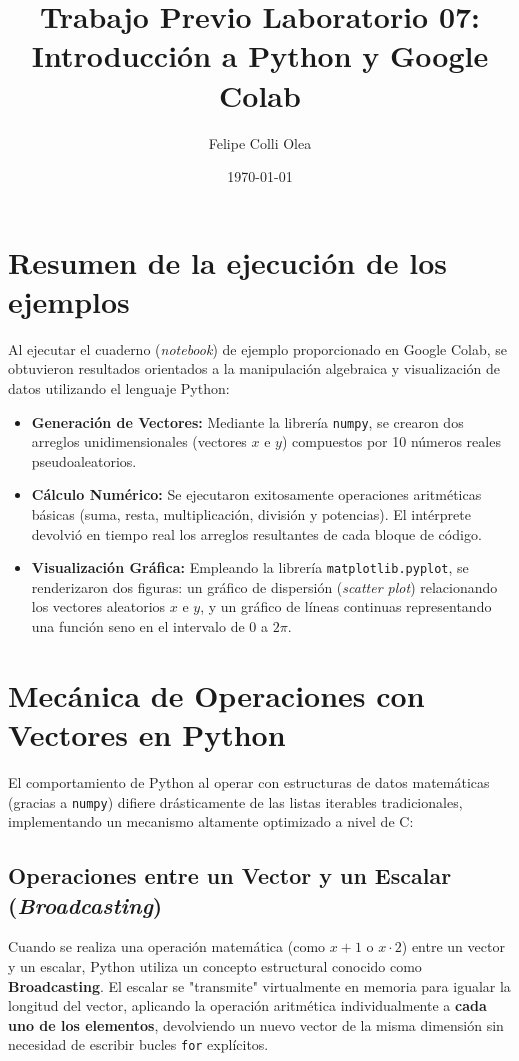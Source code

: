 \documentclass[11pt]{article}
\title{Trabajo Previo Laboratorio 07: \\ \large{Introducción a Python y Google Colab}}
\author{Felipe Colli Olea}
\date{\today}
\begin{document}
\maketitle
\thispagestyle{fancy}

\section{Resumen de la ejecución de los ejemplos}

Al ejecutar el cuaderno (\textit{notebook}) de ejemplo proporcionado en Google Colab, se obtuvieron resultados orientados a la manipulación algebraica y visualización de datos utilizando el lenguaje Python:

\begin{itemize}
	\item \textbf{Generación de Vectores:} Mediante la librería \texttt{numpy}, se crearon dos arreglos unidimensionales (vectores $x$ e $y$) compuestos por 10 números reales pseudoaleatorios.
	\item \textbf{Cálculo Numérico:} Se ejecutaron exitosamente operaciones aritméticas básicas (suma, resta, multiplicación, división y potencias). El intérprete devolvió en tiempo real los arreglos resultantes de cada bloque de código.
	\item \textbf{Visualización Gráfica:} Empleando la librería \texttt{matplotlib.pyplot}, se renderizaron dos figuras: un gráfico de dispersión (\textit{scatter plot}) relacionando los vectores aleatorios $x$ e $y$, y un gráfico de líneas continuas representando una función seno en el intervalo de $0$ a $2\pi$.
\end{itemize}

\section{Mecánica de Operaciones con Vectores en Python}

El comportamiento de Python al operar con estructuras de datos matemáticas (gracias a \texttt{numpy}) difiere drásticamente de las listas iterables tradicionales, implementando un mecanismo altamente optimizado a nivel de C:

\subsection*{Operaciones entre un Vector y un Escalar (\textit{Broadcasting})}
Cuando se realiza una operación matemática (como $x + 1$ o $x \cdot 2$) entre un vector y un escalar, Python utiliza un concepto estructural conocido como \textbf{Broadcasting}. El escalar se "transmite" virtualmente en memoria para igualar la longitud del vector, aplicando la operación aritmética individualmente a \textbf{cada uno de los elementos}, devolviendo un nuevo vector de la misma dimensión sin necesidad de escribir bucles \texttt{for} explícitos.
\end{document}
